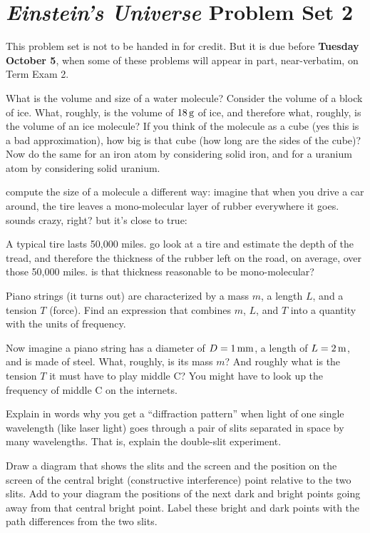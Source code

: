 \documentclass[12pt, letterpaper]{article}
\begin{document}
\section*{\textsl{Einstein's Universe} Problem Set 2}

This problem set is not to be handed in for credit. But it is due
before \textbf{Tuesday October 5}, when some of these problems
will appear in part, near-verbatim, on Term Exam 2.

\begin{problem}
What is the volume and size of a
water molecule?
Consider the volume of a block of ice. What,
roughly, is the volume of $18\,\mathrm{g}$ of ice, and therefore what,
roughly, is the volume of an ice molecule? If you think of the
molecule as a cube (yes this is a bad approximation), how big is that
cube (how long are the sides of the cube)? Now do the same for an iron
atom by considering solid iron, and for a uranium atom by considering
solid uranium.
\end{problem}

\begin{problem}
compute the size of a molecule a different way: imagine that when you
drive a car around, the tire leaves a mono-molecular layer of rubber
everywhere it goes. sounds crazy, right? but it's close to true:

A typical tire lasts 50,000 miles. go look at a tire and estimate the
depth of the tread, and therefore the thickness of the rubber left on
the road, on average, over those 50,000 miles. is that thickness
reasonable to be mono-molecular?
\end{problem}

\begin{problem}
Piano strings (it turns out) are characterized by a mass $m$, a length
$L$, and a tension $T$ (force). Find an expression that combines $m$,
$L$, and $T$ into a quantity with the units of frequency.

Now imagine a piano string has a diameter of $D=1\,\mathrm{mm}$, a length of
$L=2\,\mathrm{m}$, and is made of steel. What, roughly, is its mass $m$? And
roughly what is the tension $T$ it must have to play middle C? You
might have to look up the frequency of middle C on the internets.
\end{problem}

\begin{problem}
Explain in words why you get a ``diffraction pattern'' when light of
one single wavelength (like laser light) goes through a pair of slits
separated in space by many wavelengths. That is, explain the
double-slit experiment.

Draw a diagram that shows the slits and the screen and the position on
the screen of the central bright (constructive interference) point
relative to the two slits. Add to your diagram the positions of the
next dark and bright points going away from that central bright
point. Label these bright and dark points with the path differences
from the two slits.
\end{problem}
\end{document}
